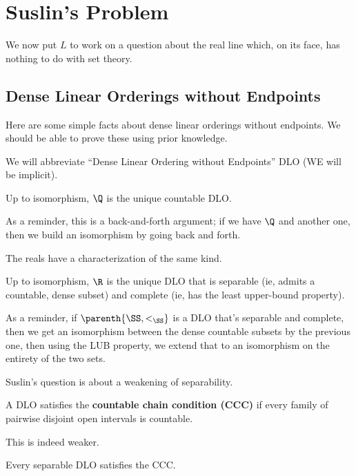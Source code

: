 \section{Suslin's Problem} \label{Ch4:Sec:Suslin}

We now put $L$ to work on a question about the real line which, on its face, has nothing to do with set theory.

\subsection{Dense Linear Orderings without Endpoints}

Here are some simple facts about dense linear orderings without endpoints. We should be able to prove these using prior knowledge.

We will abbreviate ``Dense Linear Ordering without Endpoints'' DLO (WE will be implicit).

\begin{boxlemma}
    Up to isomorphism, $\Q$ is the unique countable DLO.
\end{boxlemma}

As a reminder, this is a back-and-forth argument; if we have $\Q$ and another one, then we build an isomorphism by going back and forth.

The reals have a characterization of the same kind.

\begin{boxlemma}
    Up to isomorphism, $\R$ is the unique DLO that is separable (ie, admits a countable, dense subset) and complete (ie, has the least upper-bound property).
\end{boxlemma}

As a reminder, if $\parenth{\SS, <_{\SS}}$ is a DLO that's separable and complete, then we get an isomorphism between the dense countable subsets by the previous one, then using the LUB property, we extend that to an isomorphism on the entirety of the two sets.

Suslin's question is about a weakening of separability.

\begin{boxdefinition}
    A DLO satisfies the \textbf{countable chain condition (CCC)} if every family of pairwise disjoint open intervals is countable.
\end{boxdefinition}

This is indeed weaker.

\begin{boxlemma}
    Every separable DLO satisfies the CCC.
\end{boxlemma}

